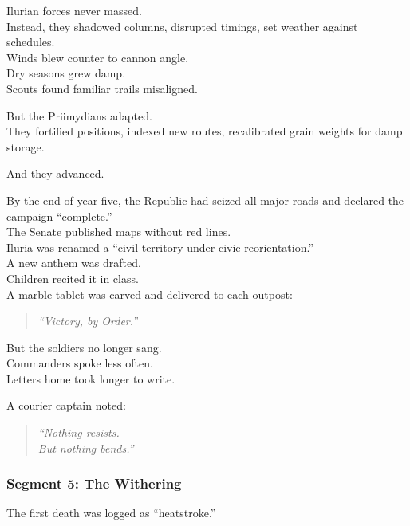 \documentclass[9pt]{article}
\begin{document}
\vspace{1em}

Ilurian forces never massed.\\
Instead, they shadowed columns, disrupted timings, set weather against schedules.\\
Winds blew counter to cannon angle.\\
Dry seasons grew damp.\\
Scouts found familiar trails misaligned.

But the Priimydians adapted.\\
They fortified positions, indexed new routes, recalibrated grain weights for damp storage.

And they advanced.

\vspace{1em}

By the end of year five, the Republic had seized all major roads and declared the campaign “complete.”\\
The Senate published maps without red lines.\\
Iluria was renamed a “civil territory under civic reorientation.”\\
A new anthem was drafted.\\
Children recited it in class.\\
A marble tablet was carved and delivered to each outpost:

\begin{quote}
\textit{“Victory, by Order.”}
\end{quote}

\vspace{1em}

But the soldiers no longer sang.\\
Commanders spoke less often.\\
Letters home took longer to write.

A courier captain noted:

\begin{quote}
\textit{“Nothing resists.}\\
\textit{But nothing bends.”}
\end{quote}

\newpage

\subsubsection*{Segment 5: The Withering}

The first death was logged as “heatstroke.”
\end{document}
